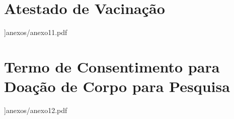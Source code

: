 \begin{anexosenv}
\chapter{Atestado de Vacinação}
{}]{anexos/anexo11.pdf}

\chapter{Termo de Consentimento para Doação de Corpo para Pesquisa}
{}]{anexos/anexo12.pdf}



\end{anexosenv}
